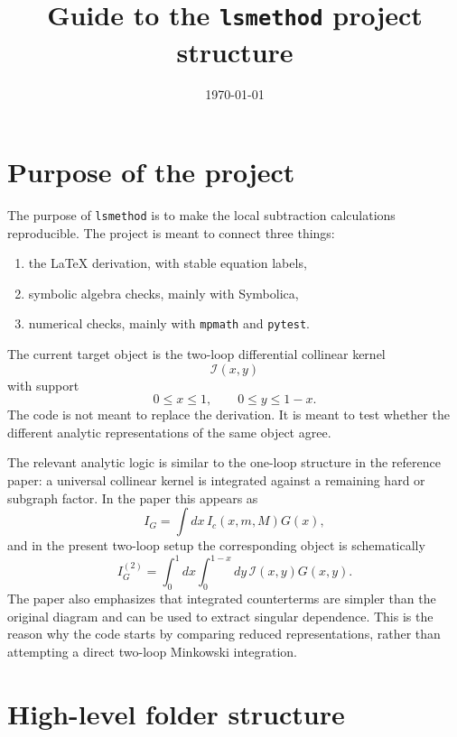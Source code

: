 \documentclass[11pt,a4paper]{article}
\title{Guide to the \texttt{lsmethod} project structure}
\author{}
\date{\today}
\begin{document}
\maketitle

\section{Purpose of the project}

The purpose of \texttt{lsmethod} is to make the local subtraction calculations reproducible. The project is meant to connect three things:
\begin{enumerate}
  \item the LaTeX derivation, with stable equation labels,
  \item symbolic algebra checks, mainly with Symbolica,
  \item numerical checks, mainly with \texttt{mpmath} and \texttt{pytest}.
\end{enumerate}

The current target object is the two-loop differential collinear kernel
\begin{equation}
  \mathcal I(x,y)
\end{equation}
with support
\begin{equation}
  0 \le x \le 1,\qquad 0 \le y \le 1-x.
\end{equation}
The code is not meant to replace the derivation. It is meant to test whether the different analytic representations of the same object agree.

The relevant analytic logic is similar to the one-loop structure in the reference paper: a universal collinear kernel is integrated against a remaining hard or subgraph factor. In the paper this appears as
\begin{equation}
  I_G = \int dx\, I_c(x,m,M)G(x),
\end{equation}
and in the present two-loop setup the corresponding object is schematically
\begin{equation}
  I_G^{(2)} = \int_0^1 dx \int_0^{1-x} dy\, \mathcal I(x,y)G(x,y).
\end{equation}
The paper also emphasizes that integrated counterterms are simpler than the original diagram and can be used to extract singular dependence. This is the reason why the code starts by comparing reduced representations, rather than attempting a direct two-loop Minkowski integration.

\section{High-level folder structure}
\end{document}
